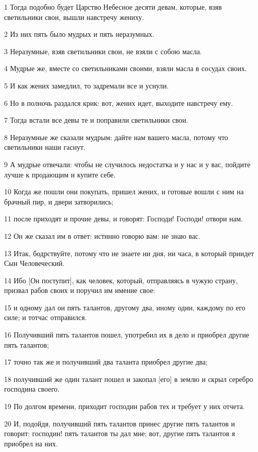 \par 1 Тогда подобно будет Царство Небесное десяти девам, которые, взяв светильники свои, вышли навстречу жениху.
\par 2 Из них пять было мудрых и пять неразумных.
\par 3 Неразумные, взяв светильники свои, не взяли с собою масла.
\par 4 Мудрые же, вместе со светильниками своими, взяли масла в сосудах своих.
\par 5 И как жених замедлил, то задремали все и уснули.
\par 6 Но в полночь раздался крик: вот, жених идет, выходите навстречу ему.
\par 7 Тогда встали все девы те и поправили светильники свои.
\par 8 Неразумные же сказали мудрым: дайте нам вашего масла, потому что светильники наши гаснут.
\par 9 А мудрые отвечали: чтобы не случилось недостатка и у нас и у вас, пойдите лучше к продающим и купите себе.
\par 10 Когда же пошли они покупать, пришел жених, и готовые вошли с ним на брачный пир, и двери затворились;
\par 11 после приходят и прочие девы, и говорят: Господи! Господи! отвори нам.
\par 12 Он же сказал им в ответ: истинно говорю вам: не знаю вас.
\par 13 Итак, бодрствуйте, потому что не знаете ни дня, ни часа, в который приидет Сын Человеческий.
\par 14 Ибо [Он поступит], как человек, который, отправляясь в чужую страну, призвал рабов своих и поручил им имение свое:
\par 15 и одному дал он пять талантов, другому два, иному один, каждому по его силе; и тотчас отправился.
\par 16 Получивший пять талантов пошел, употребил их в дело и приобрел другие пять талантов;
\par 17 точно так же и получивший два таланта приобрел другие два;
\par 18 получивший же один талант пошел и закопал [его] в землю и скрыл серебро господина своего.
\par 19 По долгом времени, приходит господин рабов тех и требует у них отчета.
\par 20 И, подойдя, получивший пять талантов принес другие пять талантов и говорит: господин! пять талантов ты дал мне; вот, другие пять талантов я приобрел на них.
